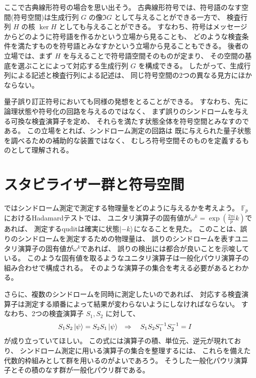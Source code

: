 \documentclass[../master.tex]{subfiles}
\begin{document}
ここで古典線形符号の場合を思い出そう。
古典線形符号では、符号語のなす空間(符号空間)は生成行列 $G$ の像$\Im G$ として与えることができる一方で、
検査行列 $H$ の核 $\ker H$ としても与えることができる。
すなわち、符号はメッセージからどのように符号語を作るかという立場から見ることも、
どのような検査条件を満たすものを符号語とみなすかという立場から見ることもできる。
後者の立場では、まず $H$ を与えることで符号語空間そのものが定まり、
その空間の基底を選ぶことによって対応する生成行列 $G$ を構成できる。
したがって、生成行列による記述と検査行列による記述は、
同じ符号空間の2つの異なる見方にほかならない。

量子誤り訂正符号においても同様の発想をとることができる。
すなわち、先に論理状態や符号化の回路を与えるのではなく、
まず誤りのシンドロームを与える可換な検査演算子を定め、
それらを満たす状態全体を符号空間とみなすのである。
この立場をとれば、シンドローム測定の回路は
既に与えられた量子状態を調べるための補助的な装置ではなく、
むしろ符号空間そのものを定義するものとして理解される。

\section{スタビライザー群と符号空間}
ではシンドローム測定で測定する物理量をどのように与えるかを考えよう。
$\mathbb{F}_p$におけるHadamardテストでは、
ユニタリ演算子の固有値が$\omega^k = \exp(\frac{2\pi i}{p}k)$であれば、
測定するquditは確実に状態$\ket{-k}$になることを見た。
このことは、誤りのシンドロームを測定するための物理量は、
誤りのシンドロームを表すユニタリ演算子の固有値が$\omega^k$であれば、
誤りの検出には都合が良いことを示唆している。
このような固有値を取るようなユニタリ演算子は一般化パウリ演算子の組み合わせで構成される。
そのような演算子の集合を考える必要があるとわかる。

さらに、複数のシンドロームを同時に測定したいのであれば、
対応する検査演算子は測定する順番によって結果が変わらないようにしなければならない。
すなわち、2つの検査演算子 $S_1,S_2$ に対して、
\begin{equation}\begin{aligned}[b]
    S_1S_2\ket{\psi} &= S_2S_1\ket{\psi}  &
    \Rightarrow \quad S_1S_2S_1^{-1}S_2^{-1}&=I
\end{aligned}\end{equation}
が成り立っていてほしい。
この式には演算子の積、単位元、逆元が現れており、
シンドローム測定に用いる演算子の集合を整理するには、
これらを備えた代数的枠組みとして群を用いるのがよいであろう。
そうした一般化パウリ演算子とその積のなす群が一般化パウリ群である。
\end{document}
